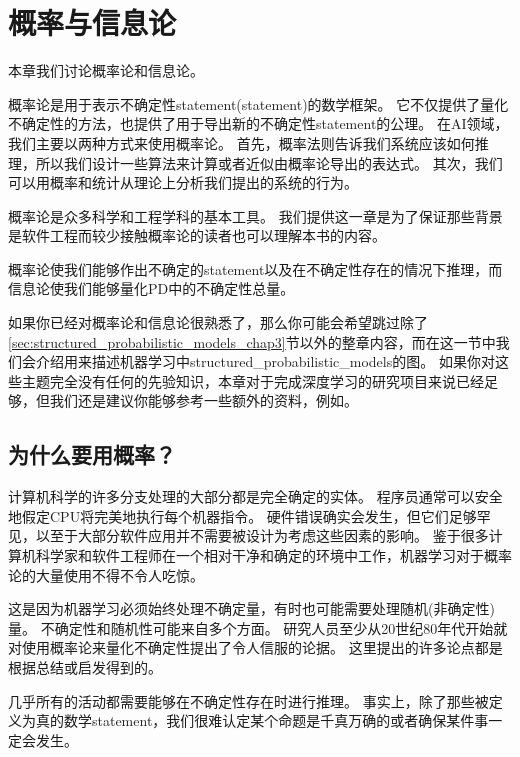 \chapter{概率与信息论}
\label{chap:probability_and_information_theory}

本章我们讨论概率论和信息论。

概率论是用于表示不确定性\gls{statement}(statement)的数学框架。%
它不仅提供了量化不确定性的方法，也提供了用于导出新的不确定性\gls{statement}的公理。
在\gls{AI}领域，我们主要以两种方式来使用概率论。
首先，概率法则告诉我们系统应该如何推理，所以我们设计一些算法来计算或者近似由概率论导出的表达式。
其次，我们可以用概率和统计从理论上分析我们提出的系统的行为。

概率论是众多科学和工程学科的基本工具。
我们提供这一章是为了保证那些背景是软件工程而较少接触概率论的读者也可以理解本书的内容。

概率论使我们能够作出不确定的\gls{statement}以及在不确定性存在的情况下推理，而信息论使我们能够量化\gls{PD}中的不确定性总量。

如果你已经对概率论和信息论很熟悉了，那么你可能会希望跳过除了\ref{sec:structured_probabilistic_models_chap3}节以外的整章内容，而在这一节中我们会介绍用来描述机器学习中\gls{structured_probabilistic_models}的图。
如果你对这些主题完全没有任何的先验知识，本章对于完成深度学习的研究项目来说已经足够，但我们还是建议你能够参考一些额外的资料，例如\cite{Jaynes03}。


\section{为什么要用概率？}
\label{sec:why_probability}

计算机科学的许多分支处理的大部分都是完全确定的实体。
程序员通常可以安全地假定CPU将完美地执行每个机器指令。
硬件错误确实会发生，但它们足够罕见，以至于大部分软件应用并不需要被设计为考虑这些因素的影响。
鉴于很多计算机科学家和软件工程师在一个相对干净和确定的环境中工作，机器学习对于概率论的大量使用不得不令人吃惊。

这是因为机器学习必须始终处理不确定量，有时也可能需要处理随机(非确定性)量。
不确定性和随机性可能来自多个方面。
研究人员至少从20世纪80年代开始就对使用概率论来量化不确定性提出了令人信服的论据。
这里提出的许多论点都是根据\cite{Pearl88}总结或启发得到的。

几乎所有的活动都需要能够在不确定性存在时进行推理。
事实上，除了那些被定义为真的数学\gls{statement}，我们很难认定某个命题是千真万确的或者确保某件事一定会发生。

